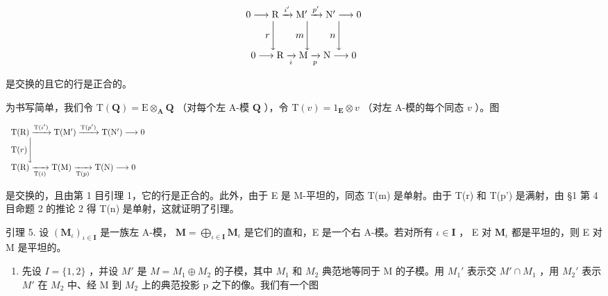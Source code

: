 \[
\begin{array}{c} 0 \longrightarrow \mathrm{R} \xrightarrow {i ^ {\prime}} \mathrm{M} ^ {\prime} \xrightarrow {p ^ {\prime}} \mathrm{N} ^ {\prime} \longrightarrow 0 \\ r \Biggl \downarrow \qquad m \Biggl \downarrow \qquad n \Biggl \downarrow \\ 0 \longrightarrow \mathrm{R} \xrightarrow [ i ]{} \mathrm{M} \xrightarrow [ p ]{} \mathrm{N} \longrightarrow 0 \end{array}
\]

是交换的且它的行是正合的。

为书写简单，我们令 \(\mathrm{T}(\mathbf{Q}) = \mathrm{E} \otimes_{\mathbf{A}} \mathbf{Q}\) （对每个左 A-模 \(\mathbf{Q}\) ），令 \(\mathrm{T}(v) = 1_{\mathbf{E}} \otimes v\) （对左 A-模的每个同态 \(v\) ）。图

\[
\begin{array}{l} \mathrm{T} (\mathrm{R}) \xrightarrow {\mathrm{T} (i ^ {\prime})} \mathrm{T} (\mathrm{M} ^ {\prime}) \xrightarrow {\mathrm{T} (p ^ {\prime})} \mathrm{T} (\mathrm{N} ^ {\prime}) \longrightarrow 0 \\ \mathrm{T} (r) \Bigg \downarrow \qquad \qquad \qquad \qquad \qquad \qquad \qquad \qquad \qquad \qquad \qquad \qquad \qquad \qquad \qquad \qquad \qquad \qquad \qquad \qquad \qquad \qquad \qquad \qquad \qquad \qquad \qquad \qquad \qquad \qquad \qquad \qquad \qquad \qquad \\ \mathrm{T} (\mathrm{R}) \xrightarrow [ \mathrm{T} (i) ]{} \mathrm{T} (\mathrm{M}) \xrightarrow [ \mathrm{T} (p) ]{} \mathrm{T} (\mathrm{N}) \longrightarrow 0 \end{array}
\]

是交换的，且由第 1 目引理 1，它的行是正合的。此外，由于 E 是 M-平坦的，同态 T(m) 是单射。由于 T(r) 和 T(p') 是满射，由 §1 第 4 目命题 2 的推论 2 得 T(n) 是单射，这就证明了引理。

引理 5. 设 \((\mathbf{M}_{\iota})_{\iota \in \mathbf{I}}\) 是一族左 A-模， \(\mathbf{M} = \bigoplus_{\iota \in \mathbf{I}} \mathbf{M}_{\iota}\) 是它们的直和，E 是一个右 A-模。若对所有 \(\iota \in \mathbf{I}\) ， E 对 \(\mathbf{M}_{\iota}\) 都是平坦的，则 E 对 M 是平坦的。

\begin{enumerate}
\def\labelenumi{(\alph{enumi})}
\tightlist
\item
  先设 \(I = \{1, 2\}\) ，并设 \(M'\) 是 \(M = M_{1} \oplus M_{2}\) 的子模，其中 \(M_{1}\) 和 \(M_{2}\) 典范地等同于 M 的子模。用 \(M_{1}'\) 表示交 \(M' \cap M_{1}\) ，用 \(M_{2}'\) 表示 \(M'\) 在 \(M_{2}\) 中、经 M 到 \(M_{2}\) 上的典范投影 p 之下的像。我们有一个图
\end{enumerate}

